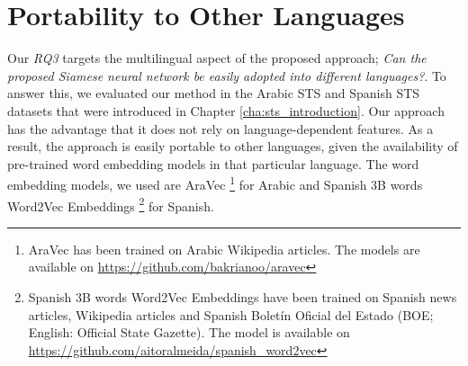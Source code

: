 \section{Portability to Other Languages}
\label{sec:siamese_languages}
Our \textit{RQ3} targets the multilingual aspect of the proposed approach; \textit{Can the proposed Siamese neural network be easily adopted into different languages?}. To answer this, we evaluated our method in the Arabic STS and Spanish STS datasets that were introduced in Chapter \ref{cha:sts_introduction}. Our approach has the advantage that it does not rely on language-dependent features.  As a result, the approach is easily portable to other languages, given the availability of pre-trained word embedding models in that particular language. The word embedding models, we used are AraVec \autocite{SOLIMAN2017256} \footnote{AraVec has been trained on Arabic Wikipedia articles. The models are available on \url{https://github.com/bakrianoo/aravec}} for Arabic and Spanish 3B words Word2Vec Embeddings \autocite{doi:10.1177/1550147718811827}\footnote{Spanish 3B words Word2Vec Embeddings have been trained on Spanish news articles, Wikipedia articles and Spanish Boletín Oficial del Estado (BOE; English: Official State Gazette). The model is available on \url{https://github.com/aitoralmeida/spanish_word2vec}} for Spanish.


\begin{table}[htb]
	\centering
	\caption[Results for Arabic STS with Siamese Neural Network]{Results for Arabic STS dataset with different variants of Siamese Neural Network. For each variant, Pearson Correlation ($\bm{\rho}$) and Spearman Correlation ($\bm{\tau}$) are reported between the predicted values and the gold labels of the test set. The best result from all the variations is marked with ${\dagger}$. }  
	\label{tab:arabic_siamese}
\end{table}


